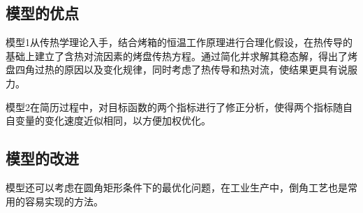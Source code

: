 \documentclass{my_paper}
\begin{document}
\subsection{模型的优点}
模型1从传热学理论入手，结合烤箱的恒温工作原理进行合理化假设，在热传导的基础上建立了含热对流因素的烤盘传热方程。通过简化并求解其稳态解，得出了烤盘四角过热的原因以及变化规律，同时考虑了热传导和热对流，使结果更具有说服力。

模型2在简历过程中，对目标函数的两个指标进行了修正分析，使得两个指标随自自变量的变化速度近似相同，以方便加权优化。

\subsection{模型的改进}
模型还可以考虑在圆角矩形条件下的最优化问题，在工业生产中，倒角工艺也是常用的容易实现的方法。





 

\end{document}
